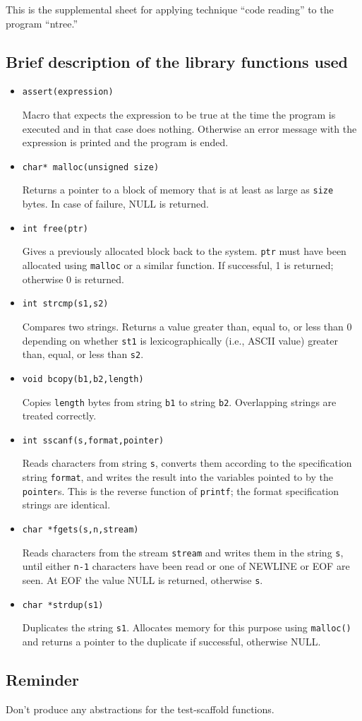
This is the supplemental sheet 
for applying technique ``code reading''
to the program ``ntree.''

\subsection*{Brief description of the library functions used}

\begin{itemize}

\item {\tt assert(expression)}

Macro that expects the expression to be true at the time the
program is executed and in that case does nothing.  Otherwise an error
message with the expression is printed and the program is ended.

\item {\tt char* malloc(unsigned size)}

Returns a pointer to a block of memory that is at least as large as
{\tt size} bytes.  In case of failure, NULL is returned.

\item {\tt int free(ptr)}

Gives a previously allocated block back to the system.  
{\tt ptr} must have been allocated using {\tt malloc} or a similar
function.  If successful, 1 is returned; otherwise 0 is returned.

\item {\tt int strcmp(s1,s2)}

Compares two strings.  Returns a value greater than, equal to, or less
than 0 depending on whether {\tt st1} is lexicographically (i.e.,
ASCII value) greater than, equal, or less than {\tt s2}.

\item {\tt void bcopy(b1,b2,length)}

Copies {\tt length} bytes from string {\tt b1} to string {\tt b2}.
Overlapping strings are treated correctly.

\item {\tt int sscanf(s,format,pointer)}

Reads characters from string {\tt s}, converts them according to
the specification string {\tt format}, and writes the result into
the variables pointed to by the {\tt pointer}s.
This is the reverse function of {\tt printf}; the format specification
strings are identical.

\item {\tt char *fgets(s,n,stream)}

Reads characters from the stream {\tt stream} and writes them in the
string {\tt s}, until either {\tt n-1} characters have been read or
one of NEWLINE or EOF are seen.
At EOF the value NULL is returned, otherwise {\tt s}.

\item {\tt char *strdup(s1)}

Duplicates the string {\tt s1}.  Allocates memory for this purpose
using {\tt malloc()} and returns a pointer to the duplicate if
successful, otherwise NULL.

\end{itemize}

\subsection*{Reminder}

Don't produce any abstractions for the test-scaffold functions.

